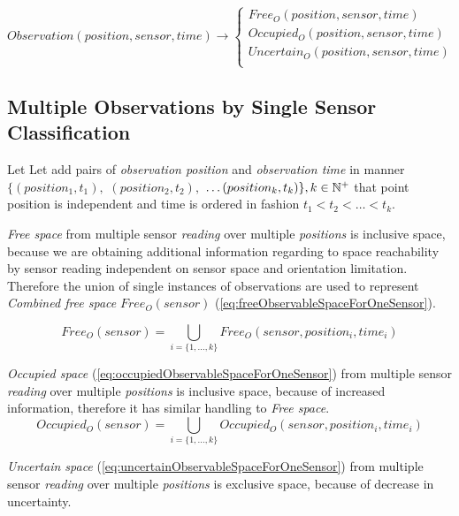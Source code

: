     \begin{equation}\label{eq:observationClassification}
        Observation(position,sensor,time)\to
        \begin{cases}
            Free_O(position,sensor,time)\\
            Occupied_O(position,sensor,time)\\
            Uncertain_O(position,sensor,time)\\
        \end{cases}
    \end{equation}


\subsection{Multiple Observations by Single Sensor Classification}\label{multipleObservationsBySingleSensor}
    \noindent Let Let add pairs of \emph{observation position} and \emph{observation time} in manner $\{(position_1,t_1),$ $(position_2,t_2),$ $\dots(position_k,t_k)\}, k\in\mathbb{N}^+$ that point position is independent and time is ordered in fashion $t_1 < t_2 < \dots < t_k$.
 
 
    \emph{Free space} from multiple sensor \emph{reading} over multiple \emph{positions} is inclusive space, because we are obtaining additional information regarding to space reachability by sensor reading independent on sensor space and orientation limitation. Therefore the union of single instances of observations are used to represent \emph{Combined free space} $Free_O(sensor)$ (\ref{eq:freeObservableSpaceForOneSensor}).

    \begin{equation}\label{eq:freeObservableSpaceForOneSensor}
        Free_O(sensor)= \bigcup_{i=\{1,\dots,k\}}Free_O(sensor,position_i,time_i)
    \end{equation}
 
    \emph{Occupied space} (\ref{eq:occupiedObservableSpaceForOneSensor}) from multiple sensor \emph{reading} over multiple \emph{positions} is inclusive space, because of increased information, therefore it has similar handling to \emph{Free space}.
    \begin{equation}\label{eq:occupiedObservableSpaceForOneSensor}
        Occupied_O(sensor)= \bigcup_{i=\{1,\dots,k\}}Occupied_O(sensor,position_i,time_i)
    \end{equation}
 
    \emph{Uncertain space} (\ref{eq:uncertainObservableSpaceForOneSensor}) from multiple sensor \emph{reading} over multiple \emph{positions} is exclusive space, because of decrease in uncertainty. 
 
